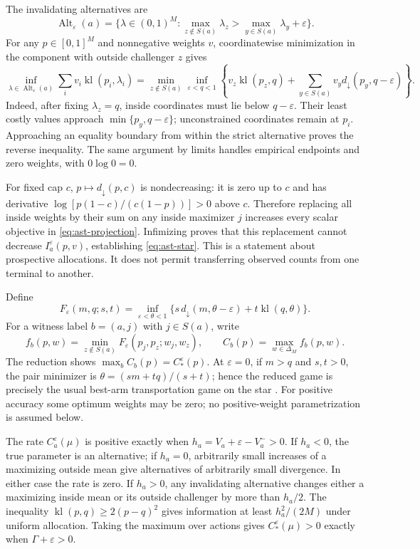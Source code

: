 \documentclass{article}
\theoremstyle{plain}
\theoremstyle{definition}
\begin{document}
The invalidating alternatives are
\[
 \operatorname{Alt}_\varepsilon(a)=
 \{\lambda\in(0,1)^M:
          \max_{z\notin S(a)}\lambda_z>
          \max_{y\in S(a)}\lambda_y+\varepsilon\}.
\]
For any $p\in[0,1]^M$ and nonnegative weights $v$, coordinatewise minimization
in the component with outside challenger $z$ gives
\begin{equation}
 \inf_{\lambda\in\operatorname{Alt}_\varepsilon(a)}
           \sum_i v_i\operatorname{kl}(p_i,\lambda_i)
 =\min_{z\notin S(a)}\inf_{\varepsilon<q<1}
 \left\{v_z\operatorname{kl}(p_z,q)
       +\sum_{y\in S(a)}v_y d_\downarrow(p_y,q-\varepsilon)\right\}.
 \label{eq:ast-projection}
\end{equation}
Indeed, after fixing $\lambda_z=q$, inside coordinates must lie below
$q-\varepsilon$.  Their least costly values approach
$\min\{p_y,q-\varepsilon\}$; unconstrained coordinates remain at $p_i$.
Approaching an equality boundary from within the strict alternative proves
the reverse inequality.  The same argument by limits handles empirical
endpoints and zero weights, with $0\log0=0$.

For fixed cap $c$, $p\mapsto d_\downarrow(p,c)$ is nondecreasing: it is zero
up to $c$ and has derivative
$\log[p(1-c)/(c(1-p))]>0$ above $c$.  Therefore replacing all inside weights
by their sum on any inside maximizer $j$ increases every scalar objective
in \eqref{eq:ast-projection}.  Infimizing proves that this replacement
cannot decrease $I_a^\varepsilon(p,v)$, establishing
\eqref{eq:ast-star}.  This is a statement about prospective allocations.
It does not permit transferring observed counts from one terminal to another.

Define
\begin{equation}
 F_\varepsilon(m,q;s,t)=
 \inf_{\varepsilon<\theta<1}
 \{s\,d_\downarrow(m,\theta-\varepsilon)
                         +t\operatorname{kl}(q,\theta)\}.
 \label{eq:ast-pair}
\end{equation}
For a witness label $b=(a,j)$ with $j\in S(a)$, write
\[
 f_b(p,w)=\min_{z\notin S(a)}F_\varepsilon(p_j,p_z;w_j,w_z),\qquad
 C_b(p)=\max_{w\in\Delta_M}f_b(p,w).
\]
The reduction shows $\max_b C_b(p)=C_*^\varepsilon(p)$.
At $\varepsilon=0$, if $m>q$ and $s,t>0$, the pair minimizer is
$\theta=(sm+tq)/(s+t)$; hence the reduced game is precisely the usual
best-arm transportation game on the star
\citep{garivier2016optimal}.  For positive accuracy some optimum weights may
be zero; no positive-weight parametrization is assumed below.

The rate $C_a^\varepsilon(\mu)$ is positive exactly when
$h_a=V_a+\varepsilon-V_a^->0$.  If $h_a<0$, the true parameter is an
alternative; if $h_a=0$, arbitrarily small increases of a maximizing outside
mean give alternatives of arbitrarily small divergence.  In either case
the rate is zero.  If $h_a>0$, any invalidating alternative changes either a
maximizing inside mean or its outside challenger by more than $h_a/2$.
The inequality $\operatorname{kl}(p,q)\ge2(p-q)^2$ gives information at least
$h_a^2/(2M)$ under uniform allocation.  Taking the maximum over actions gives
$C_*^\varepsilon(\mu)>0$ exactly when $\Gamma+\varepsilon>0$.
\end{document}
